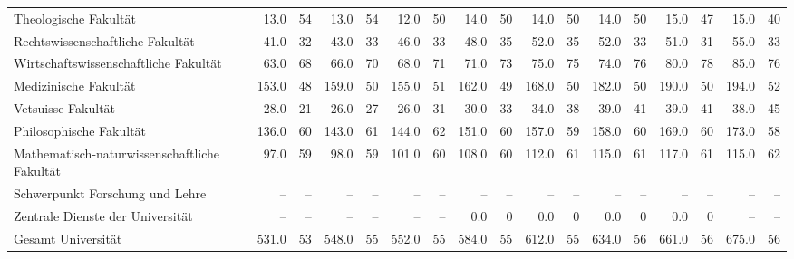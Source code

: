 \documentclass{article}
\begin{document}
\begin{longtable}{@{}l rr rr rr rr rr rr rr rr@{}}
    Theologische Fakultät & 13.0 & 54 & 13.0 & 54 & 12.0 & 50 & 14.0 & 50 & 14.0 & 50 & 14.0 & 50 & 15.0 & 47 & 15.0 & 40 \\
    Rechtswissenschaftliche Fakultät & 41.0 & 32 & 43.0 & 33 & 46.0 & 33 & 48.0 & 35 & 52.0 & 35 & 52.0 & 33 & 51.0 & 31 & 55.0 & 33 \\
    Wirtschaftswissenschaftliche Fakultät & 63.0 & 68 & 66.0 & 70 & 68.0 & 71 & 71.0 & 73 & 75.0 & 75 & 74.0 & 76 & 80.0 & 78 & 85.0 & 76 \\
    Medizinische Fakultät & 153.0 & 48 & 159.0 & 50 & 155.0 & 51 & 162.0 & 49 & 168.0 & 50 & 182.0 & 50 & 190.0 & 50 & 194.0 & 52 \\
    Vetsuisse Fakultät & 28.0 & 21 & 26.0 & 27 & 26.0 & 31 & 30.0 & 33 & 34.0 & 38 & 39.0 & 41 & 39.0 & 41 & 38.0 & 45 \\
    Philosophische Fakultät & 136.0 & 60 & 143.0 & 61 & 144.0 & 62 & 151.0 & 60 & 157.0 & 59 & 158.0 & 60 & 169.0 & 60 & 173.0 & 58 \\
    Mathematisch-naturwissenschaftliche Fakultät & 97.0 & 59 & 98.0 & 59 & 101.0 & 60 & 108.0 & 60 & 112.0 & 61 & 115.0 & 61 & 117.0 & 61 & 115.0 & 62 \\
    Schwerpunkt Forschung und Lehre & -- & -- & -- & -- & -- & -- & -- & -- & -- & -- & -- & -- & -- & -- & -- & -- \\
    Zentrale Dienste der Universität & -- & -- & -- & -- & -- & -- & 0.0 & 0 & 0.0 & 0 & 0.0 & 0 & 0.0 & 0 & -- & -- \\
    Gesamt Universität & 531.0 & 53 & 548.0 & 55 & 552.0 & 55 & 584.0 & 55 & 612.0 & 55 & 634.0 & 56 & 661.0 & 56 & 675.0 & 56 \\
\end{longtable}
\end{document}
